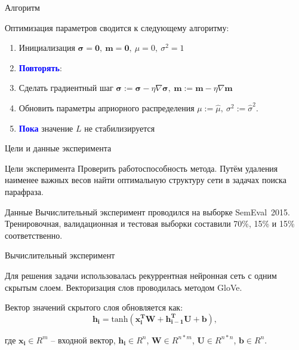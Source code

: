 \documentclass{beamer}
\newcommand{\bm}{{\textbf{m}}}
\newcommand{\bs}{{\boldsymbol{\sigma}}}
\begin{document}
\begin{frame}{Алгоритм}

Оптимизация параметров сводится к следующему алгоритму:

\begin{enumerate}
	\item Инициализация $\bs = \textbf{0}, \ \bm = \textbf{0}, \ \mu = 0, \ \sigma^2 = 1$
	
	\item \textcolor{blue}{\textbf{Повторять}}:
	
	\item Сделать градиентный шаг $\bs:=\bs-\eta\nabla\bs, \ \bm:=\bm-\eta\nabla\bm$
	
	\item Обновить параметры априорного распределения $\mu:= \hat{\mu}, \ \sigma^2:=\hat{\sigma}^2$.
	
	\item \textcolor{blue}{\textbf{Пока}} значение $L$ не стабилизируется
	

\end{enumerate}

\end{frame}

\begin{frame}{Цели и данные эксперимента}

\begin{block}{Цели эксперимента}
Проверить работоспособность метода. Путём удаления наименее важных весов найти оптимальную структуру сети в задачах поиска парафраза.
\end{block}

\begin{block}{Данные}
Вычислительный эксперимент проводился на выборке SemEval~2015. Тренировочная, валидационная и тестовая выборки составили 70\%, 15\% и 15\% соответственно.
\end{block}

\end{frame}

\begin{frame}{Вычислительный эксперимент}

Для решения задачи использовалась рекуррентная нейронная сеть с одним скрытым слоем.
Векторизация слов проводилась методом GloVe.

Вектор значений скрытого слоя обновляется как:
$$\mathbf{h_i} = \text{tanh}(\mathbf{x_i^TW} + \mathbf{h_{i-1}^TU} + \mathbf{b}),$$

где $\mathbf{x_i}\in R^m$ -- входной вектор, $\mathbf{h_i}\in R^n$, $\mathbf{W}\in R^{n*m}$, $\mathbf{U}\in R^{n*n}$, $\mathbf{b} \in R^n$.

\end{frame}
\end{document}
